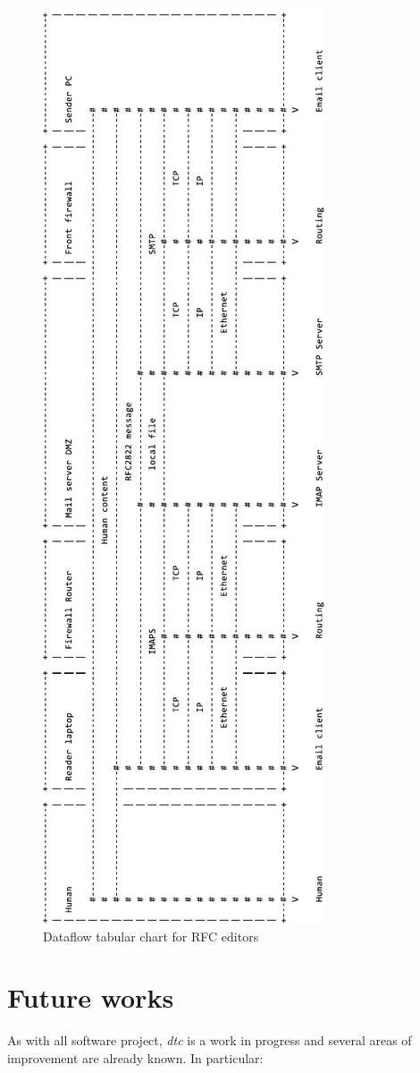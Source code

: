 \documentclass{article}
\begin{document}
\begin{figure}[ht]
	\centering
	\includegraphics[width=.5\textwidth]{img/rfc.pdf}
	\caption{Dataflow tabular chart for RFC editors}
	\label{fig:rutschle:rfc}
\end{figure}


\section{Future works}

As with all software project, \emph{dtc} is a work in progress and several areas of improvement are already known. In particular:
\end{document}
